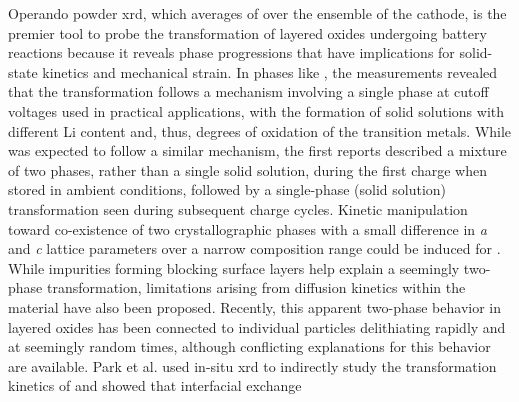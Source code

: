 \documentclass{article}
\begin{document}



Operando powder \gls{xrd}, which averages of over the ensemble of the cathode, is the premier tool to probe the transformation of layered oxides undergoing battery reactions because it reveals phase progressions that have implications for solid-state kinetics and mechanical strain.  In \nmc{} phases like \nmc[333]{}, the measurements revealed that the transformation follows a mechanism involving a single phase at cutoff voltages used in practical applications,\cite{hulzen2018,ahn2017,zhou2016-2} with the formation of solid solutions with different Li content and, thus, degrees of oxidation of the transition metals. While \nca{} was expected to follow a similar mechanism, the first reports described a mixture of two phases, rather than a single solid solution, during the first charge when stored in ambient conditions, followed by a
single-phase (solid solution) transformation seen during subsequent
charge cycles\cite{robert2015}. Kinetic manipulation toward co-existence of two
crystallographic phases with a small difference in \emph{a} and
\emph{c} lattice parameters over a narrow composition range could be induced for \nmc[333]{} \cite{yoon2006,hua2018}. While impurities forming blocking surface layers help explain a seemingly two-phase
transformation\cite{grenier2017}, limitations arising from diffusion
kinetics within the material have also been proposed\cite{chapman2020}. Recently, this apparent two-phase behavior in layered oxides has been connected to individual particles delithiating rapidly and at
seemingly random times\cite{chueh2021, zhao2022, rao2021, wang2020-6},
although conflicting explanations for this behavior are available. Park et al. \cite{chueh2021} used in-situ
\gls{xrd} to indirectly study the transformation kinetics of \nmc[333]{} and showed that interfacial exchange
\end{document}
